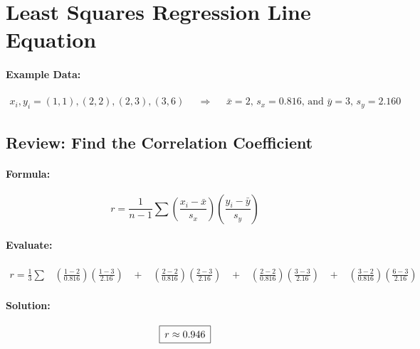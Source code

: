 \documentclass[12pt]{article}
\newcommand{\paddedBox}[1]{{\setlength\fboxsep{5pt}\boxed{#1}}}
\begin{document}

\section*{Least Squares Regression Line Equation}

\paragraph{Example Data:}
\begin{align*}
	x_{i}, y_{i} = (1, 1), (2, 2), (2, 3), (3, 6) && \Rightarrow &&
	\bar{x} = 2\text{, }s_{x} = 0.816 \text{, and }
	\bar{y} = 3 \text{, }s_{y} = 2.160
\end{align*}


\subsection{Review: Find the Correlation Coefficient}
\paragraph{Formula:}

\begin{equation}
	r = \frac{1}{n - 1}\sum
	\left(\frac{x_{i} - \bar{x}}{s_{x}}\right)
	\left(\frac{y_{i} - \bar{y}}{s_{y}}\right)
\end{equation}%

\paragraph{Evaluate:}

\begin{equation*}
\begin{gathered}
		r = \frac{1}{3}\sum \;\;\;%
		\left(\frac{1 - 2}{0.816}\right)\left(\frac{1 - 3}{2.16}\right) \;\;\;%
		+ \;\;\;%
		\left(\frac{2 - 2}{0.816}\right)\left(\frac{2 - 3}{2.16}\right) \;\;\;%
		+ \;\;\;%
		\left(\frac{2 - 2}{0.816}\right)\left(\frac{3 - 3}{2.16}\right) \;\;\;%
		+ \;\;\;%
		\left(\frac{3 - 2}{0.816}\right)\left(\frac{6 - 3}{2.16}\right) \;\;\;%
\end{gathered}%
\end{equation*}%

\paragraph{Solution:}
\begin{equation*}\paddedBox{r \approx 0.946}\end{equation*}
\end{document}
